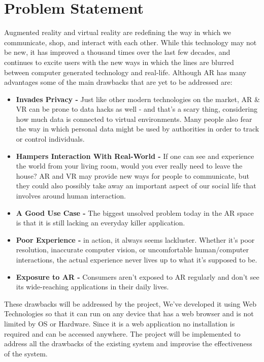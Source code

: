 \documentclass[BTech]{srmuthesis}
\begin{document}
\section{Problem Statement}
Augmented reality and virtual reality are redefining the way in which we communicate, shop, and interact with each other. While this technology may not be new, it has improved a thousand times over the last few decades, and continues to excite users with the new ways in which the lines are blurred between computer generated technology and real-life. Although AR has many advantages some of the main drawbacks that are yet to be addressed are:
\begin{itemize}
\item \textbf{Invades Privacy -} Just like other modern technologies on the market, AR \& VR can be prone to data hacks as well - and that's a scary thing, considering how much data is connected to virtual environments. Many people also fear the way in which personal data might be used by authorities in order to track or control individuals.
\item \textbf{Hampers Interaction With Real-World -}
If one can see and experience the world from your living room, would you ever really need to leave the house? AR and VR may provide new ways for people to communicate, but they could also possibly take away an important aspect of our social life that involves around human interaction.

\item \textbf{A Good Use Case -} The biggest unsolved problem today in the AR space is that it is still lacking an everyday killer application.

\item \textbf{Poor Experience -} in action, it always seems lackluster. Whether it's poor resolution, inaccurate computer vision, or uncomfortable human/computer interactions, the actual experience never lives up to what it's supposed to be.

\item \textbf{Exposure to AR -} Consumers aren't exposed to AR regularly and don't see its wide-reaching applications in their daily lives.

\end{itemize}
These drawbacks will be addressed by the project, We've developed
it using Web Technologies so that it can run on any device
that has a web browser and is not limited by OS or Hardware.
Since it is a web application no installation is required and
can be accessed anywhere. The project will be implemented to address all the drawbacks of the existing system and improvise the effectiveness of the system.
\end{document}
